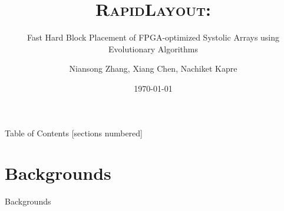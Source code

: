 \documentclass[10pt]{beamer}
\title{\textsc{RapidLayout}:}
\subtitle{Fast Hard Block Placement of FPGA-optimized Systolic Arrays using Evolutionary Algorithms}
\date{\today}
\author{Niansong Zhang, Xiang Chen, Nachiket Kapre}
\institute{Sun Yat-sen University, The University of Waterloo}
\begin{document}
\maketitle

\begin{frame}{Table of Contents}
  [sections numbered]
  \tableofcontents[hideallsubsections]
\end{frame}


\section{Backgrounds}

\begin{frame}{Backgrounds}


\end{frame}
\end{document}
